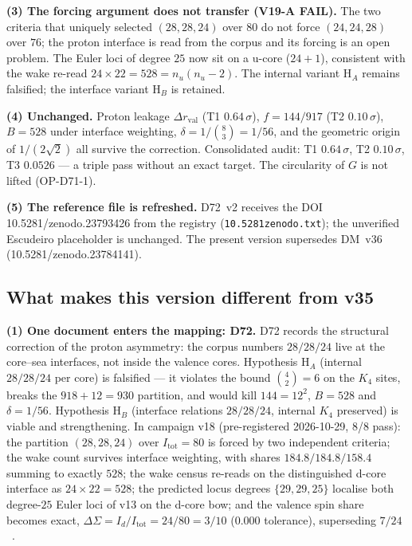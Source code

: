 \documentclass[11pt,a4paper]{article}
\theoremstyle{plain}
\theoremstyle{definition}
\theoremstyle{remark}
\begin{document}
\textbf{(3) The forcing argument does not transfer (V19-A FAIL).} The two criteria that uniquely selected $(28,28,24)$ over $80$ do not force $(24,24,28)$ over $76$; the proton interface is read from the corpus and its forcing is an open problem. The Euler loci of degree $25$ now sit on a u-core ($24+1$), consistent with the wake re-read $24\times22=528=n_u(n_u-2)$. The internal variant H$_{A}$ remains falsified; the interface variant H$_{B}$ is retained.

\textbf{(4) Unchanged.} Proton leakage $\Delta r_{\mathrm{val}}$ (T1 $0.64\,\sigma$), $f=144/917$ (T2 $0.10\,\sigma$), $B=528$ under interface weighting, $\delta=1/\binom{8}{3}=1/56$, and the geometric origin of $1/(2\sqrt{2})$ all survive the correction. Consolidated audit: T1 $0.64\,\sigma$, T2 $0.10\,\sigma$, T3 $0.0526$ --- a triple pass without an exact target. The circularity of $G$ is not lifted (OP-D71-1).

\textbf{(5) The reference file is refreshed.} D72~v2 receives the DOI 10.5281/zenodo.23793426 from the registry (\texttt{10.5281zenodo.txt}); the unverified Escudeiro placeholder is unchanged. The present version supersedes DM~v36 (10.5281/zenodo.23784141).

\subsection{What makes this version different from v35}

\textbf{(1) One document enters the mapping: D72.} D72 records the structural correction of the proton asymmetry: the corpus numbers $28/28/24$ live at the core--sea interfaces, not inside the valence cores. Hypothesis H$_{A}$ (internal $28/28/24$ per core) is falsified --- it violates the bound $\binom{4}{2}=6$ on the $K_{4}$ sites, breaks the $918+12=930$ partition, and would kill $144=12^{2}$, $B=528$ and $\delta=1/56$. Hypothesis H$_{B}$ (interface relations $28/28/24$, internal $K_{4}$ preserved) is viable and strengthening. In campaign v18 (pre-registered 2026-10-29, 8/8 pass): the partition $(28,28,24)$ over $I_{\mathrm{tot}}=80$ is forced by two independent criteria; the wake count survives interface weighting, with shares $184.8/184.8/158.4$ summing to exactly $528$; the wake census re-reads on the distinguished d-core interface as $24\times22=528$; the predicted locus degrees $\{29,29,25\}$ localise both degree-$25$ Euler loci of v13 on the d-core bow; and the valence spin share becomes exact, $\Delta\Sigma=I_{d}/I_{\mathrm{tot}}=24/80=3/10$ ($0.000$ tolerance), superseding $7/24$~\cite{D72}.
\end{document}
